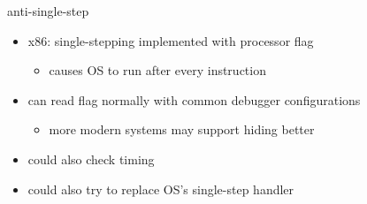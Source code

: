 \begin{frame}{anti-single-step}
    \begin{itemize}
    \item x86: single-stepping implemented with processor flag
        \begin{itemize}
        \item causes OS to run after every instruction
        \end{itemize}
    \item can read flag normally with common debugger configurations
        \begin{itemize}
        \item more modern systems may support hiding better
        \end{itemize}
    \vspace{.5cm}
    \item could also check timing
    \item could also try to replace OS's single-step handler
    \end{itemize}
\end{frame}
